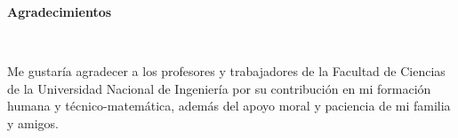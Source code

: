 \begin{agradecimientos}
    \vspace{50 mm}
    \normalsize\textbf{Agradecimientos}

    \

    Me gustaría agradecer a los profesores y trabajadores de la
    Facultad de Ciencias de la Universidad Nacional de Ingeniería por
    su contribución en mi formación humana y técnico-matemática,
    además del apoyo moral y paciencia de mi familia y amigos.
\end{agradecimientos}